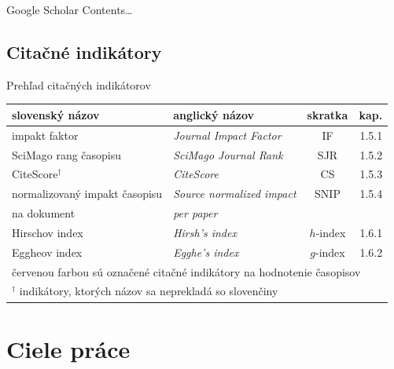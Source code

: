 \documentclass{beamer}
\begin{document}
%
%
\begin{frame}{Google Scholar}
  Contents\dots
\end{frame}


\subsection{Citačné indikátory}

%
%
\begin{frame}{Prehľad citačných indikátorov}
  \begin{table}
    \centering\footnotesize
    \begin{tabular}{llcr}
      \toprule
      slovenský názov & anglický názov & skratka & kap. \\
      \midrule
      \rowcolor{LRed} impakt faktor                 & \emph{Journal Impact Factor}    & IF        & 1.5.1 \\[0.5ex]
      \rowcolor{LRed} SciMago rang časopisu         & \emph{SciMago Journal Rank}     & SJR       & 1.5.2 \\[0.5ex]
      \rowcolor{LRed} CiteScore$^\dagger$            & \emph{CiteScore}                & CS        & 1.5.3 \\[0.5ex]
      \rowcolor{LRed} normalizovaný impakt časopisu & \emph{Source normalized impact} & SNIP      & 1.5.4 \\[-0.25ex]
      \rowcolor{LRed} na dokument                   & \emph{per paper}                &           &       \\[0.5ex]
      Hirschov index                                & \emph{Hirsh's index}            & $h$-index & 1.6.1 \\[1.5ex]
      Eggheov index                                 & \emph{Egghe's index}            & $g$-index & 1.6.2 \\[0.5ex]
      \bottomrule
      \multicolumn{4}{l}{\tiny {\color{red} červenou farbou} sú označené citačné indikátory na hodnotenie časopisov} \\
      \multicolumn{4}{l}{\tiny $^\dagger$ indikátory, ktorých názov sa neprekladá so slovenčiny}
    \end{tabular}
  \end{table}
\end{frame}


\section{Ciele práce}
\end{document}
